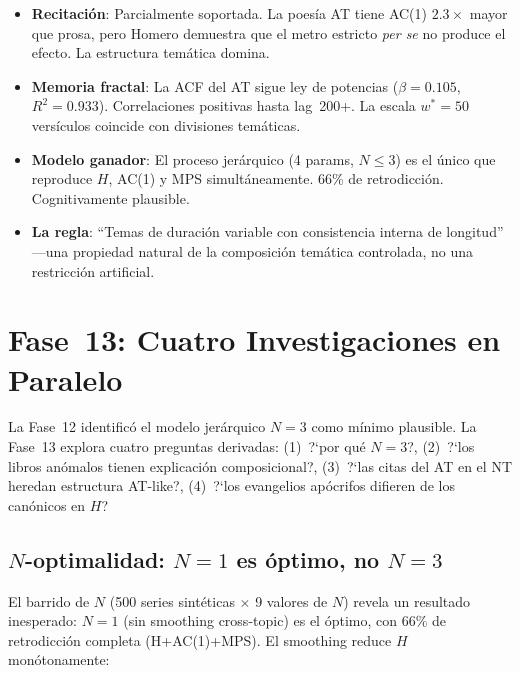\documentclass[12pt,a4paper]{article}
\begin{document}
\begin{itemize}[leftmargin=2em]
\item \textbf{Recitaci\'on}: Parcialmente soportada. La poes\'ia AT tiene AC(1)
      $2.3\times$ mayor que prosa, pero Homero demuestra que el metro estricto
      \emph{per se} no produce el efecto. La estructura tem\'atica domina.
\item \textbf{Memoria fractal}: La ACF del AT sigue ley de potencias
      ($\beta = 0.105$, $R^2 = 0.933$). Correlaciones positivas hasta lag~200+.
      La escala $w^* = 50$ vers\'iculos coincide con divisiones tem\'aticas.
\item \textbf{Modelo ganador}: El proceso jer\'arquico (4 params, $N \leq 3$)
      es el \'unico que reproduce $H$, AC(1) y MPS simult\'aneamente.
      66\% de retrodicci\'on. Cognitivamente plausible.
\item \textbf{La regla}: ``Temas de duraci\'on variable con consistencia
      interna de longitud'' ---una propiedad natural de la composici\'on
      tem\'atica controlada, no una restricci\'on artificial.
\end{itemize}


\section{Fase~13: Cuatro Investigaciones en Paralelo}

La Fase~12 identific\'o el modelo jer\'arquico $N = 3$ como m\'inimo plausible.
La Fase~13 explora cuatro preguntas derivadas: (1)~?`por qu\'e $N = 3$?,
(2)~?`los libros an\'omalos tienen explicaci\'on composicional?,
(3)~?`las citas del AT en el NT heredan estructura AT-like?,
(4)~?`los evangelios ap\'ocrifos difieren de los can\'onicos en $H$?

\subsection{$N$-optimalidad: $N = 1$ es \'optimo, no $N = 3$}

El barrido de $N$ (500 series sint\'eticas $\times$ 9 valores de $N$) revela
un resultado inesperado: $N = 1$ (sin smoothing cross-topic) es el \'optimo,
con 66\% de retrodicci\'on completa (H+AC(1)+MPS). El smoothing reduce $H$
mon\'otonamente:
\end{document}
